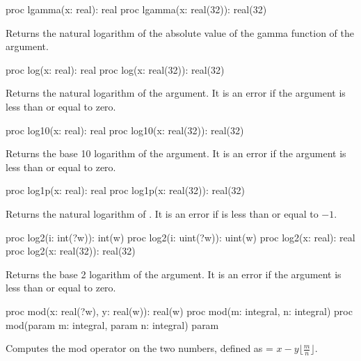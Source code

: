 \begin{protohead}
proc lgamma(x: real): real
proc lgamma(x: real(32)): real(32)
\end{protohead}
\begin{protobody}
Returns the natural logarithm of the absolute value
of the gamma function of the argument.
\end{protobody}

\begin{protohead}
proc log(x: real): real
proc log(x: real(32)): real(32)
\end{protohead}
\begin{protobody}
Returns the natural logarithm of the argument.  It is an error if the
argument is less than or equal to zero.
\end{protobody}

\begin{protohead}
proc log10(x: real): real
proc log10(x: real(32)): real(32)
\end{protohead}
\begin{protobody}
Returns the base 10 logarithm of the argument.  It is an error if the
argument is less than or equal to zero.
\end{protobody}

\begin{protohead}
proc log1p(x: real): real
proc log1p(x: real(32)): real(32)
\end{protohead}
\begin{protobody}
Returns the natural logarithm of .  It is an error
if  is less than or equal to $-1$.
\end{protobody}

\begin{protohead}
proc log2(i: int(?w)): int(w)
proc log2(i: uint(?w)): uint(w)
proc log2(x: real): real
proc log2(x: real(32)): real(32)
\end{protohead}
\begin{protobody}
Returns the base 2 logarithm of the argument.  It is an error if the
argument is less than or equal to zero.
\end{protobody}

\begin{protohead}
proc mod(x: real(?w), y: real(w)): real(w)
proc mod(m: integral, n: integral)
proc mod(param m: integral, param n: integral) param
\end{protohead}
\begin{protobody}
Computes the mod operator on the two numbers, defined as
 = $x - y \lfloor\frac{m}{n}\rfloor$.
\end{protobody}

